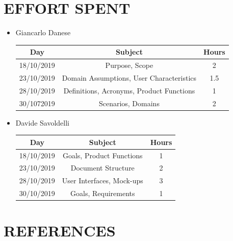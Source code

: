 \documentclass[12pt,a4paper]{article}
\begin{document}
\section{EFFORT SPENT}
\begin{itemize}
		\item Giancarlo Danese
		\begin{center}
			\begin{tabular}{| c | c | c |}
				\hline
				Day & Subject & Hours \\ \hline
				18/10/2019 & Purpose, Scope & 2 \\
				23/10/2019 & Domain Assumptions, User Characteristics & 1.5 \\
				28/10/2019 & Definitions, Acronyms, Product Functions & 1 \\
				30/1072019 & Scenarios, Domains & 2 \\
				\hline
			\end{tabular}
		\end{center}

		\item Davide Savoldelli
		\begin{center}
			\begin{tabular}{| c | c | c |}
				\hline
				Day & Subject & Hours \\ \hline
				18/10/2019 & Goals, Product Functions & 1 \\
				23/10/2019 & Document Structure & 2 \\
				28/10/2019 & User Interfaces, Mock-ups & 3 \\
				30/10/2019 & Goals, Requirements & 1 \\
				\hline
			\end{tabular}
		\end{center}
	\end{itemize}
\section{REFERENCES}
\end{document}

